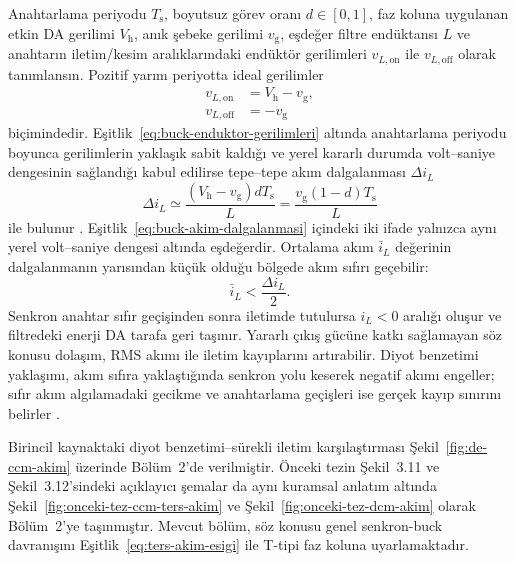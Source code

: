 Anahtarlama periyodu $T_{\mathrm{s}}$, boyutsuz görev oranı $d\in[0,1]$, faz koluna uygulanan etkin DA gerilimi $V_{\mathrm{h}}$, anık şebeke gerilimi $v_{\mathrm{g}}$, eşdeğer filtre endüktansı $L$ ve anahtarın iletim/kesim aralıklarındaki endüktör gerilimleri $v_{L,\mathrm{on}}$ ile $v_{L,\mathrm{off}}$ olarak tanımlansın. Pozitif yarım periyotta ideal gerilimler
\begin{equation}
  \begin{aligned}
    v_{L,\mathrm{on}} &= V_{\mathrm{h}}-v_{\mathrm{g}}, \\
    v_{L,\mathrm{off}} &= -v_{\mathrm{g}}
  \end{aligned}
  \label{eq:buck-enduktor-gerilimleri}
\end{equation}
biçimindedir. Eşitlik~\eqref{eq:buck-enduktor-gerilimleri} altında anahtarlama periyodu boyunca gerilimlerin yaklaşık sabit kaldığı ve yerel kararlı durumda volt--saniye dengesinin sağlandığı kabul edilirse tepe--tepe akım dalgalanması $\Delta i_L$
\begin{equation}
  \Delta i_L \simeq \frac{(V_{\mathrm{h}}-v_{\mathrm{g}})dT_{\mathrm{s}}}{L}
  =\frac{v_{\mathrm{g}}(1-d)T_{\mathrm{s}}}{L}
  \label{eq:buck-akim-dalgalanmasi}
\end{equation}
ile bulunur \citep{Erickson2001,Chen2010}. Eşitlik~\eqref{eq:buck-akim-dalgalanmasi} içindeki iki ifade yalnızca aynı yerel volt--saniye dengesi altında eşdeğerdir. Ortalama akım $\bar{i}_L$ değerinin dalgalanmanın yarısından küçük olduğu bölgede akım sıfırı geçebilir:
\begin{equation}
  \bar{i}_L < \frac{\Delta i_L}{2}.
  \label{eq:ters-akim-esigi}
\end{equation}
Senkron anahtar sıfır geçişinden sonra iletimde tutulursa $i_L<0$ aralığı oluşur ve filtredeki enerji DA tarafa geri taşınır. Yararlı çıkış gücüne katkı sağlamayan söz konusu dolaşım, RMS akımı ile iletim kayıplarını artırabilir. Diyot benzetimi yaklaşımı, akım sıfıra yaklaştığında senkron yolu keserek negatif akımı engeller; sıfır akım algılamadaki gecikme ve anahtarlama geçişleri ise gerçek kayıp sınırını belirler \citep{Chen2010,Erickson2001}.

Birincil kaynaktaki diyot benzetimi--sürekli iletim karşılaştırması Şekil~\ref{fig:de-ccm-akim} üzerinde Bölüm~2'de verilmiştir. Önceki tezin Şekil~3.11 ve Şekil~3.12'sindeki açıklayıcı şemalar da aynı kuramsal anlatım altında Şekil~\ref{fig:onceki-tez-ccm-ters-akim} ve Şekil~\ref{fig:onceki-tez-dcm-akim} olarak Bölüm~2'ye taşınmıştır. Mevcut bölüm, söz konusu genel senkron-buck davranışını Eşitlik~\ref{eq:ters-akim-esigi} ile T-tipi faz koluna uyarlamaktadır.

